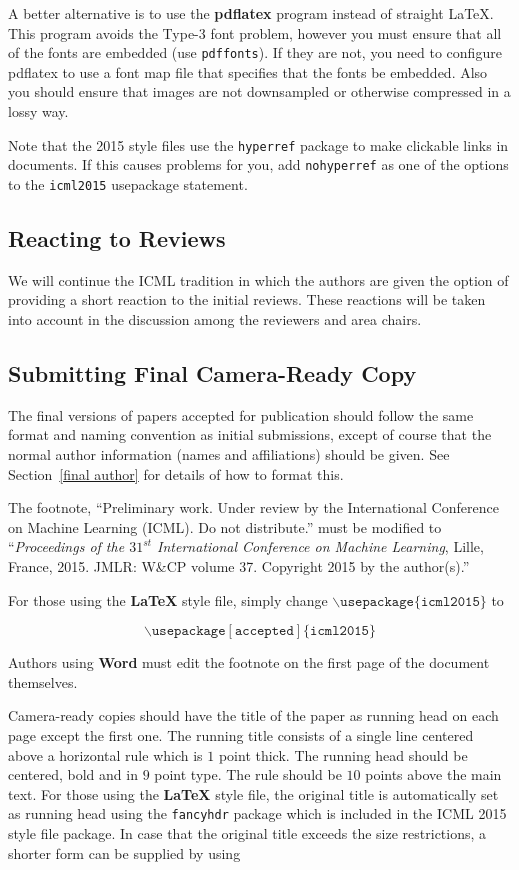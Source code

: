 \documentclass{article}
\begin{document}
A better alternative is to use the \textbf{pdflatex} program instead of
straight \LaTeX. This program avoids the Type-3 font problem, however you must
ensure that all of the fonts are embedded (use {\tt pdffonts}). If they are
not, you need to configure pdflatex to use a font map file that specifies that
the fonts be embedded. Also you should ensure that images are not downsampled
or otherwise compressed in a lossy way.

Note that the 2015 style files use the {\tt hyperref} package to
make clickable links in documents.  If this causes problems for you,
add {\tt nohyperref} as one of the options to the {\tt icml2015}
usepackage statement.

\subsection{Reacting to Reviews}

We will continue the ICML tradition in which the authors are given the
option of providing a short reaction to the initial reviews. These
reactions will be taken into account in the discussion among the
reviewers and area chairs.

\subsection{Submitting Final Camera-Ready Copy}

The final versions of papers accepted for publication should follow the
same format and naming convention as initial submissions, except of
course that the normal author information (names and affiliations)
should be given.  See Section~\ref{final author} for details of how to
format this.

The footnote, ``Preliminary work.  Under review by the International
Conference on Machine Learning (ICML).  Do not distribute.'' must be
modified to ``\textit{Proceedings of the
$\mathit{31}^{st}$ International Conference on Machine Learning},
Lille, France, 2015.  JMLR: W\&CP volume 37. 
Copyright 2015 by the author(s).''

For those using the \textbf{\LaTeX} style file, simply change
$\mathtt{\backslash usepackage\{icml2015\}}$ to 

$$\mathtt{\backslash usepackage[accepted]\{icml2015\}}$$

\noindent
Authors using \textbf{Word} must edit the
footnote on the first page of the document themselves.

Camera-ready copies should have the title of the paper as running head
on each page except the first one.  The running title consists of a
single line centered above a horizontal rule which is $1$ point thick.
The running head should be centered, bold and in $9$ point type.  The
rule should be $10$ points above the main text.  For those using the
\textbf{\LaTeX} style file, the original title is automatically set as running
head using the {\tt fancyhdr} package which is included in the ICML
2015 style file package.  In case that the original title exceeds the
size restrictions, a shorter form can be supplied by using
\end{document}
